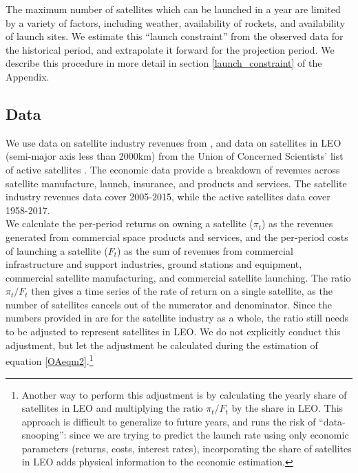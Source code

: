 \documentclass[12pt]{article}
\begin{document}
The maximum number of satellites which can be launched in a year are limited by a variety of factors, including weather, availability of rockets, and availability of launch sites. We estimate this ``launch constraint'' from the observed data for the historical period, and extrapolate it forward for the projection period. We describe this procedure in more detail in section \ref{launch_constraint} of the Appendix.

\subsection{Data}

We use data on satellite industry revenues from \citet{wienzierl2018}, and data on satellites in LEO (semi-major axis less than 2000km) from the Union of Concerned Scientists' list of active satellites \citep{UCSdata}. The economic data provide a breakdown of revenues across satellite manufacture, launch, insurance, and products and services. The satellite industry revenues data cover 2005-2015, while the active satellites data cover 1958-2017. \\

We calculate the per-period returns on owning a satellite ($\pi_t$) as the revenues generated from commercial space products and services, and the per-period costs of launching a satellite ($F_t$) as the sum of revenues from commercial infrastructure and support industries, ground stations and equipment, commercial satellite manufacturing, and commercial satellite launching. The ratio $\pi_t/F_t$ then gives a time series of the rate of return on a single satellite, as the number of satellites cancels out of the numerator and denominator. Since the numbers provided in \citet{wienzierl2018} are for the satellite industry as a whole, the ratio still needs to be adjusted to represent satellites in LEO. We do not explicitly conduct this adjustment, but let the adjustment be calculated during the estimation of equation \ref{OAeqm2}.\footnote{Another way to perform this adjustment is by calculating the yearly share of satellites in LEO and multiplying the ratio $\pi_t/F_t$ by the share in LEO. This approach is difficult to generalize to future years, and runs the risk of ``data-snooping'': since we are trying to predict the launch rate using only economic parameters (returns, costs, interest rates), incorporating the share of satellites in LEO adds physical information to the economic estimation.} \\ %
\end{document}
